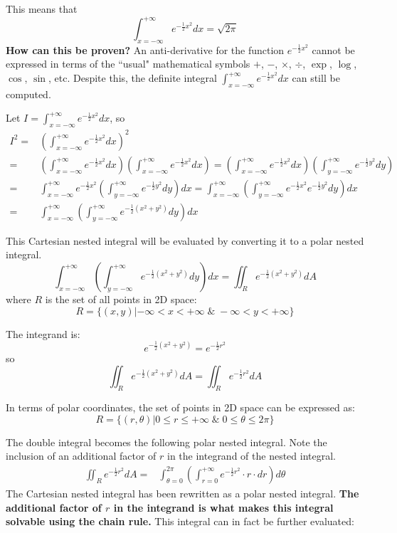 \documentclass{article}
\begin{document}
This means that 
\[\int_{x = -\infty}^{+\infty} e^{-\frac{1}{2}x^2} dx = \sqrt{2\pi}\]
{\bf How can this be proven?} An anti-derivative for the function \(e^{-\frac{1}{2}x^2}\) cannot be expressed in terms of the ``usual" mathematical symbols \(+\), \(-\), \(\times\), \(\div\), \(\exp\), \(\log\), \(\cos\), \(\sin\), etc. Despite this, the definite integral \(\int_{x = -\infty}^{+\infty} e^{-\frac{1}{2}x^2} dx\) can still be computed. 

Let \(I = \int_{x = -\infty}^{+\infty} e^{-\frac{1}{2}x^2} dx\), so 
\begin{align*}
I^2 = & \left(\int_{x = -\infty}^{+\infty} e^{-\frac{1}{2}x^2} dx\right)^2 \\
= & \left(\int_{x = -\infty}^{+\infty} e^{-\frac{1}{2}x^2} dx\right)\left(\int_{x = -\infty}^{+\infty} e^{-\frac{1}{2}x^2} dx\right)
= \left(\int_{x = -\infty}^{+\infty} e^{-\frac{1}{2}x^2} dx\right)\left(\int_{y = -\infty}^{+\infty} e^{-\frac{1}{2}y^2} dy\right) \\ 
= & \int_{x = -\infty}^{+\infty} e^{-\frac{1}{2}x^2}\left(\int_{y = -\infty}^{+\infty} e^{-\frac{1}{2}y^2} dy\right) dx 
= \int_{x = -\infty}^{+\infty} \left(\int_{y = -\infty}^{+\infty} e^{-\frac{1}{2}x^2}e^{-\frac{1}{2}y^2} dy\right) dx \\ 
= & \int_{x = -\infty}^{+\infty} \left(\int_{y = -\infty}^{+\infty} e^{-\frac{1}{2}(x^2 + y^2)} dy\right) dx
\end{align*}

This Cartesian nested integral will be evaluated by converting it to a polar nested integral.
\[\int_{x = -\infty}^{+\infty} \left(\int_{y = -\infty}^{+\infty} e^{-\frac{1}{2}(x^2 + y^2)} dy\right) dx = \iint_R e^{-\frac{1}{2}(x^2 + y^2)}dA\]
where \(R\) is the set of all points in 2D space:
\[R = \{(x,y) | -\infty < x < +\infty \;\&\; -\infty < y < +\infty\}\]

The integrand is:
\[e^{-\frac{1}{2}(x^2 + y^2)} = e^{-\frac{1}{2}r^2}\]
so
\[\iint_R e^{-\frac{1}{2}(x^2 + y^2)}dA = \iint_R e^{-\frac{1}{2}r^2}dA\]

In terms of polar coordinates, the set of points in 2D space can be expressed as:
\[R = \{(r,\theta) | 0 \leq r \leq +\infty \;\&\; 0 \leq \theta \leq 2\pi \}\]

The double integral becomes the following polar nested integral. Note the inclusion of an additional factor of \(r\) in the integrand of the nested integral.
\begin{align*}
\iint_R e^{-\frac{1}{2}r^2}dA = & \int_{\theta = 0}^{2\pi} \left(\int_{r = 0}^{+\infty} e^{-\frac{1}{2}r^2} \cdot r \cdot dr \right)d\theta
\end{align*}
The Cartesian nested integral has been rewritten as a polar nested integral. {\bf The additional factor of \(r\) in the integrand is what makes this integral solvable using the chain rule.} This integral can in fact be further evaluated:
\end{document}
